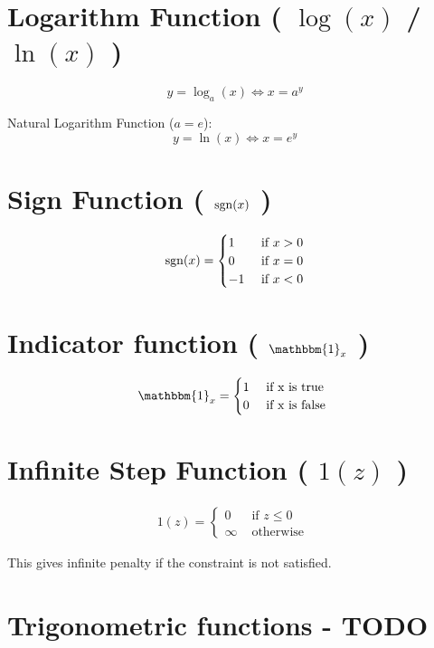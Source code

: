 \section{Logarithm Function ( $\log(x)$ / $\ln(x)$ )}\label{Logarithm Function}
\[
    y = \log_a(x) \Leftrightarrow x = a^y
\]

Natural Logarithm Function ($a=e$):
\[
    y = \ln(x) \Leftrightarrow x = e^y
\]


\section{Sign Function ( $\operatorname{sgn}(x)$ )}\label{Sign Function}
\begin{align*}
    \operatorname{sgn}(x) = \begin{cases}
         1 & \text{ if } x > 0 \\
         0 & \text{ if } x = 0 \\
         -1 & \text{ if } x < 0 
        \end{cases}
\end{align*}



\section{Indicator function ( $\mathbbm{1}_x$ )}\label{Indicator function}

\begin{align*}
    \mathbbm{1}_x = {\begin{cases}
        1 & \text{ if x is true } \\
        0 & \text{ if x is false }
    \end{cases}}
\end{align*}

\section{Infinite Step Function ( $1(z)$ )}

\begin{align*}
    1(z) = {\begin{cases}
        0 & \text{ if } z \leq 0 \\
        \infty & \text{ otherwise }
    \end{cases}}
\end{align*}

This gives infinite penalty if the constraint is not satisfied.


\section{Trigonometric functions - TODO \cite{wiki-Trigonometric_functions}}\label{Trigonometric functions}

